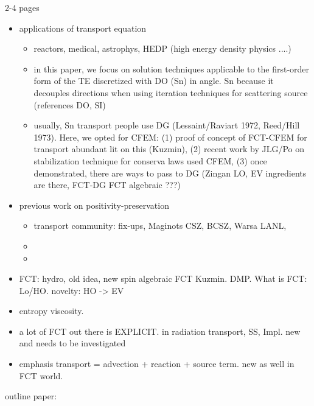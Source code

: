 2-4 pages
\begin{itemize}
\item applications of transport equation
\begin{itemize}
\item reactors, medical, astrophys, HEDP (high energy density physics ....)
\item  in this paper, we focus on solution techniques applicable to the first-order form of the TE discretized with DO (Sn) in angle. Sn because it decouples directions when using iteration techniques for scattering source (references DO, SI)
\item usually, Sn transport people use DG (Lessaint/Raviart 1972, Reed/Hill 1973). Here, we opted for CFEM: (1) proof of concept of FCT-CFEM for transport abundant lit on this (Kuzmin), (2) recent work by JLG/Po on stabilization technique for conserva laws used CFEM, (3) once demonstrated, there are ways to pass to DG (Zingan LO, EV ingredients are there, FCT-DG  FCT algebraic ???)
\end{itemize}

\item previous work on positivity-preservation
\begin{itemize}
\item transport community: fix-ups, Maginots CSZ, BCSZ, Warsa LANL, 
\item 
\item 
\end{itemize}
\item FCT: hydro, old idea, new spin algebraic FCT Kuzmin. DMP. What is FCT: Lo/HO. novelty: HO -> EV
\item entropy viscosity.
\item a lot of FCT out there is EXPLICIT. in radiation transport, SS, Impl. new and needs to be investigated
\item emphasis transport = advection + reaction + source term. new as well in FCT world.
\end{itemize}

outline paper:




